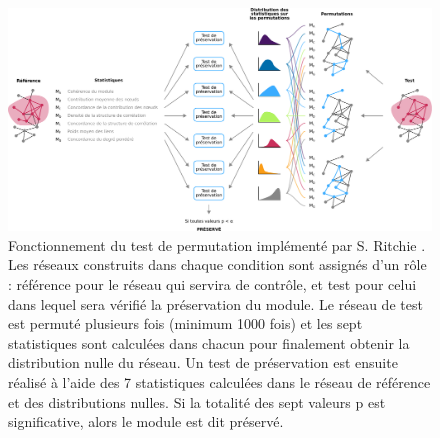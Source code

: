 \begin{figure}[ht]
    \centering
    \includegraphics[width=\textwidth]{img/intro/3_coexpr/intro_3_coexpr_netrep_permut.pdf}
    \caption[Fonctionnement du test de permutation implémenté par S. Ritchie.]{Fonctionnement du test de permutation implémenté par S. Ritchie \cite{Ritchie2016}. Les réseaux construits dans chaque condition sont assignés d'un rôle : référence pour le réseau qui servira de contrôle, et test pour celui dans lequel sera vérifié la préservation du module. Le réseau de test est permuté plusieurs fois (minimum 1000 fois) et les sept statistiques sont calculées dans chacun pour finalement obtenir la distribution nulle du réseau. Un test de préservation est ensuite réalisé à l'aide des 7 statistiques calculées dans le réseau de référence et des distributions nulles. Si la totalité des sept valeurs p est significative, alors le module est dit préservé.}
    \label{fig:permutation_test}
\end{figure}


